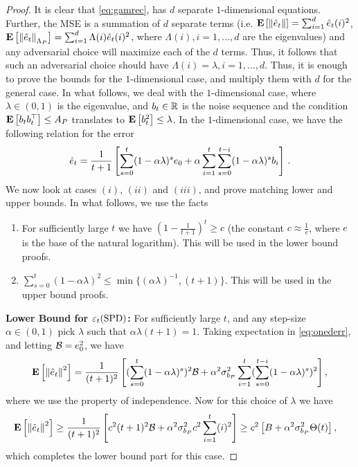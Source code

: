 \begin{proof}
It is clear that \eqref{eq:gamrec}, has $d$ separate $1$-dimensional equations. Further, the MSE is a summation of $d$ separate terms (i.e. $\mathbf{E}\left[\left\| \hat{e}_t\right\|\right]=\sum_{i=1}^d \hat{e}_t(i)^2$, $\mathbf{E}\left[\left\| \hat{e}_t\right\|_{\Lambda_P}\right]=\sum_{i=1}^d \Lambda(i) \hat{e}_t(i)^2$, where $\Lambda(i),i=1,\ldots, d$ are the eigenvalues) and any adversarial choice will maximize each of the $d$ terms. Thus, it follows that such an adversarial choice should have $\Lambda(i)=\lambda, i=1,\ldots, d$. Thus, it is enough to prove the bounds for the $1$-dimensional case, and multiply them with $d$ for the general case. In what follows, we deal with the $1$-dimensional case, where $\lambda\in (0,1)$ is the eigenvalue, and $b_t\in \mathbb{R}$ is the noise sequence and the condition $\mathbf{E}\left[b_tb_t^\top\right]\leq A_P$ translates to $\mathbf{E}\left[b_t^2\right]\leq \lambda$. In the $1$-dimensional case, we have the following relation for the error
\begin{align}\label{eq:onederr}
\hat{e}_t=\frac{1}{t+1}\left[\sum_{s=0}^t (1-\alpha \lambda)^s e_0+ \alpha \sum_{i=1}^t \sum_{s=0}^{t-i} (1-\alpha \lambda)^s b_i\right]\,.
\end{align}
We now look at cases $(i)$, $(ii)$ and $(iii)$, and prove matching lower and upper bounds. In what follows, we use the facts
\begin{enumerate}
\item For sufficiently large $t$ we have $(1-\frac{1}{t+1})^t\geq c$ (the constant $c\approx \frac{1}{e}$, where $e$ is the base of the natural logarithm). This will be used in the lower bound proofs.
\item $\sum_{s=0}^t(1-\alpha \lambda)^2\leq \min\{(\alpha\lambda)^{-1},(t+1)\}$. This will be used in the upper bound proofs.
 \end{enumerate}
\textbf{Lower Bound for $\varepsilon_t(\mathrm{SPD})$:}
 For sufficiently large $t$, and any step-size$\alpha \in (0,1)$ pick $\lambda$ such that $\alpha \lambda (t+1)=1$. Taking expectation in \eqref{eq:onederr}, and letting $\mathcal{B}=e_0^2$, we have
\begin{align}\label{eq:intererr}
\mathbf{E}\left[\left\| \hat{e}_t\right\|^2\right]=\frac{1}{(t+1)^2}\left[ (\sum_{s=0}^t(1-\alpha \lambda)^s)^2 \mathcal{B}+ \alpha^2\sigma^2_{b_P} \sum_{i=1}^t (\sum_{s=0}^{t-i} (1-\alpha \lambda)^s)^2\right],
\end{align}
where we use the property of independence. Now for this choice of $\lambda$ we have
\begin{align}
\mathbf{E}\left[\left\| \hat{e}_t\right\|^2\right]&\geq \frac{1}{(t+1)^2}\left[ c^2(t+1)^2 \mathcal{B}+ \alpha^2\sigma^2_{b_P} c^2\sum_{i=1}^t (i)^2\right]
\geq c^2\left[B+ \alpha^2 \sigma^2_{b_P} \Theta(t) \right],
\end{align}
which completes the lower bound part for this case.


\end{proof}
